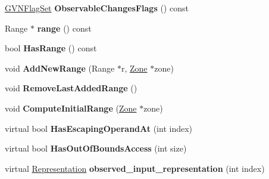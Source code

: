 \begin{DoxyCompactItemize}
\item 
\hypertarget{classv8_1_1internal_1_1_h_value_a204131ec03f3a397e9510d0de777b03e}{}\hyperlink{classv8_1_1internal_1_1_enum_set}{G\+V\+N\+Flag\+Set} {\bfseries Observable\+Changes\+Flags} () const \label{classv8_1_1internal_1_1_h_value_a204131ec03f3a397e9510d0de777b03e}

\item 
\hypertarget{classv8_1_1internal_1_1_h_value_a5bef369ba8d54762e3a8d30f581364ab}{}Range $\ast$ {\bfseries range} () const \label{classv8_1_1internal_1_1_h_value_a5bef369ba8d54762e3a8d30f581364ab}

\item 
\hypertarget{classv8_1_1internal_1_1_h_value_a45c979c5c12b992b388f2fcdcf685f8c}{}bool {\bfseries Has\+Range} () const \label{classv8_1_1internal_1_1_h_value_a45c979c5c12b992b388f2fcdcf685f8c}

\item 
\hypertarget{classv8_1_1internal_1_1_h_value_a503c08d0640bd54543cb73221e6701bb}{}void {\bfseries Add\+New\+Range} (Range $\ast$r, \hyperlink{classv8_1_1internal_1_1_zone}{Zone} $\ast$zone)\label{classv8_1_1internal_1_1_h_value_a503c08d0640bd54543cb73221e6701bb}

\item 
\hypertarget{classv8_1_1internal_1_1_h_value_a3540e96e8edb7b3cb8bc548703029c00}{}void {\bfseries Remove\+Last\+Added\+Range} ()\label{classv8_1_1internal_1_1_h_value_a3540e96e8edb7b3cb8bc548703029c00}

\item 
\hypertarget{classv8_1_1internal_1_1_h_value_af7f7ae914e9ab81c68801d6bd47563b3}{}void {\bfseries Compute\+Initial\+Range} (\hyperlink{classv8_1_1internal_1_1_zone}{Zone} $\ast$zone)\label{classv8_1_1internal_1_1_h_value_af7f7ae914e9ab81c68801d6bd47563b3}

\item 
\hypertarget{classv8_1_1internal_1_1_h_value_a7b6f3f9f02d1bc6d7ebf834cc0d7a5e9}{}virtual bool {\bfseries Has\+Escaping\+Operand\+At} (int index)\label{classv8_1_1internal_1_1_h_value_a7b6f3f9f02d1bc6d7ebf834cc0d7a5e9}

\item 
\hypertarget{classv8_1_1internal_1_1_h_value_a648f7643d459fba45b1d5cbb3b2a0e33}{}virtual bool {\bfseries Has\+Out\+Of\+Bounds\+Access} (int size)\label{classv8_1_1internal_1_1_h_value_a648f7643d459fba45b1d5cbb3b2a0e33}

\item 
\hypertarget{classv8_1_1internal_1_1_h_value_a454a8ece64d922ecc506dd4a16385767}{}virtual \hyperlink{classv8_1_1internal_1_1_representation}{Representation} {\bfseries observed\+\_\+input\+\_\+representation} (int index)\label{classv8_1_1internal_1_1_h_value_a454a8ece64d922ecc506dd4a16385767}


\end{DoxyCompactItemize}
